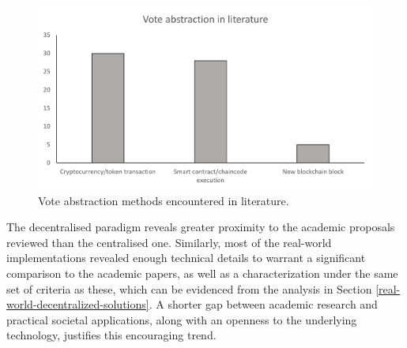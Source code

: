 \documentclass[../access.tex]{subfiles}
\begin{document}
\begin{figure}[ht!]
    \centering
    \includegraphics[width=\columnwidth]{Images/almei6.png}
    \caption{Vote abstraction methods encountered in literature.}
    \label{fig:vote-abstraction-methods}
\end{figure}

The decentralised paradigm reveals greater proximity to the academic proposals reviewed than the centralised one. Similarly, most of the real-world implementations revealed enough technical details to warrant a significant comparison to the academic papers, as well as a characterization under the same set of criteria as these, which can be evidenced from the analysis in Section \ref{real-world-decentralized-solutions}. A shorter gap between academic research and practical societal applications, along with an openness to the underlying technology, justifies this encouraging trend.
\twocolumn
\end{document}
